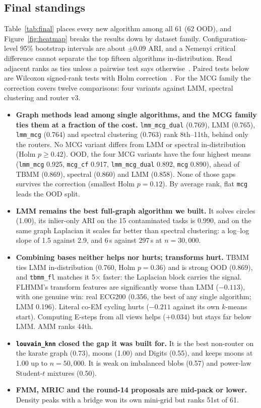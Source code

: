 \documentclass[11pt,a4paper]{article}
\newcommand{\code}[1]{\texttt{#1}}
\begin{document}
\subsection{Final standings}
Table~\ref{tab:final} places every new algorithm among all 61 (62 OOD), and
Figure~\ref{fig:heatmap} breaks the results down by dataset family.
Configuration-level 95\% bootstrap intervals are about $\pm0.09$ ARI, and a
Nemenyi critical difference cannot separate the top fifteen algorithms
in-distribution. Read adjacent ranks as ties unless a pairwise test says
otherwise~\cite{clustbenchharness}. Paired tests below are Wilcoxon
signed-rank tests with Holm correction~\cite{holm1979simple}. For the MCG
family the correction covers twelve comparisons: four variants against LMM,
spectral clustering and router v3.
\begin{itemize}
  \item \textbf{Graph methods lead among single algorithms, and the MCG
  family ties them at a fraction of the cost.} \code{lmm\_mcg\_dual} (0.769),
  LMM (0.765), \code{lmm\_mcg} (0.764) and spectral clustering (0.763) rank
  8th--11th, behind only the routers. No MCG variant differs from LMM or
  spectral in-distribution (Holm $p \ge 0.42$). OOD, the four MCG variants
  have the four highest means (\code{lmm\_mcg} 0.925, \code{mcg\_cf} 0.917,
  \code{lmm\_mcg\_dual} 0.892, \code{mcg} 0.890), ahead of TBMM (0.869),
  spectral (0.860) and LMM (0.858). None of those gaps survives the
  correction (smallest Holm $p = 0.12$). By average rank, flat \code{mcg}
  leads the OOD split.
  \item \textbf{LMM remains the best full-graph algorithm we built.} It
  solves circles (1.00), its inlier-only ARI on the 15 contaminated tasks is
  0.990, and on the same graph Laplacian it scales far better than spectral
  clustering: a log--log slope of 1.5 against 2.9, and 6\,s against 297\,s at
  $n{=}30{,}000$.
  \item \textbf{Combining bases neither helps nor hurts; transforms hurt.}
  TBMM ties LMM in-distribution (0.760, Holm $p = 0.36$) and is strong OOD
  (0.869), and \code{tbmm\_fl} matches it 5$\times$ faster: the Laplacian
  block carries the signal. FLHMM's transform features are significantly
  worse than LMM ($-0.113$), with one genuine win: real ECG200 (0.356, the
  best of any single algorithm; LMM 0.196). Literal co-EM cycling hurts
  ($-0.211$ against its own $k$-means start). Computing E-steps from all
  views helps ($+0.034$) but stays far below LMM. AMM ranks 44th.
  \item \textbf{\code{louvain\_knn} closed the gap it was built for.} It is
  the best non-router on the karate graph (0.73), moons (1.00) and Digits
  (0.55), and keeps moons at 1.00 up to $n{=}50{,}000$. It is weak on
  imbalanced blobs (0.57) and power-law Student-$t$ mixtures (0.50).
  \item \textbf{FMM, MRIC and the round-14 proposals are mid-pack or lower.}
  Density peaks with a bridge won its own mini-grid but ranks 51st of 61.
\end{itemize}
\end{document}
